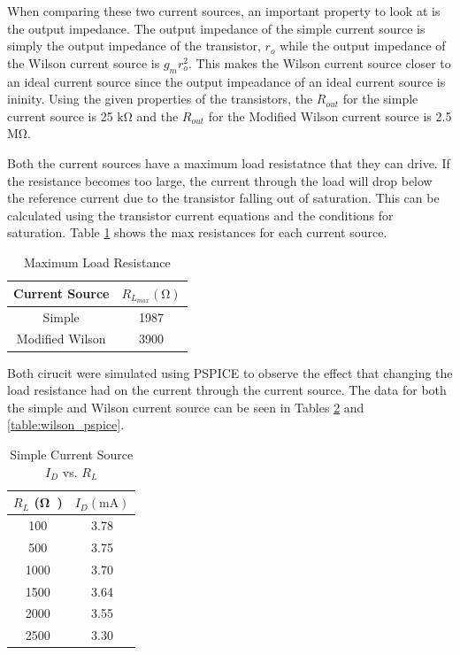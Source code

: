 \documentclass[11pt]{article}
\begin{document}
	\hfill \break

	When comparing these two current sources, an important property to look
	at is the output impedance. The output impedance of the simple current 
	source is simply the output impedance of the transistor, $r_o$ while the
	output impedance of the Wilson current source is $g_m r_o^2$. This makes
	the Wilson current source closer to an ideal current source since the 
	output impeadance of an ideal current source is ininity. Using the given
	properties of the transistors, the $R_{out}$ for the simple current source
	is 25 $\si{\kilo\ohm}$ and the $R_{out}$ for the Modified Wilson current
	source is 2.5 $\si{\mega\ohm}$.\\

	

	\hfill \break

	Both the current sources have a maximum load resistatnce that they can
	drive. If the resistance becomes too large, the current through the load
	will drop below the reference current due to the transistor falling out 
	of saturation. This can be calculated using the transistor current equations
	and the conditions for saturation. Table \ref{table:max_res} shows the max
	resistances for each current source.

	\begin{table}[H]
		\centering
		\caption{Maximum Load Resistance}
		\label{table:max_res}
		\begin{tabular}{|c|c|}
			\hline
			Current Source & $R_{L_{max}} (\si\ohm)$\\
			\hline
			Simple & 1987\\
			\hline
			Modified Wilson & 3900\\
			\hline
		\end{tabular}
	\end{table}

	Both cirucit were simulated using PSPICE to observe the effect that 
	changing the load resistance had on the current through the current
	source. The data for both the simple and Wilson current source can
	be seen in Tables \ref{table:simple_pspice} and \ref{table:wilson_pspice}.

	\begin{table}[H]
		\centering
		\caption{Simple Current Source $I_D$ vs. $R_L$}
		\label{table:simple_pspice}
		\begin{tabular}{|c|c|}
			\hline
			$R_L$ (\si\ohm) & $I_D (\si{\milli\ampere})$\\
			\hline
			100 & 3.78\\
			500 & 3.75\\
			1000 & 3.70\\
			1500 & 3.64\\
			2000 & 3.55\\
			2500 & 3.30\\
			\hline
		\end{tabular}
	\end{table}
\end{document}
